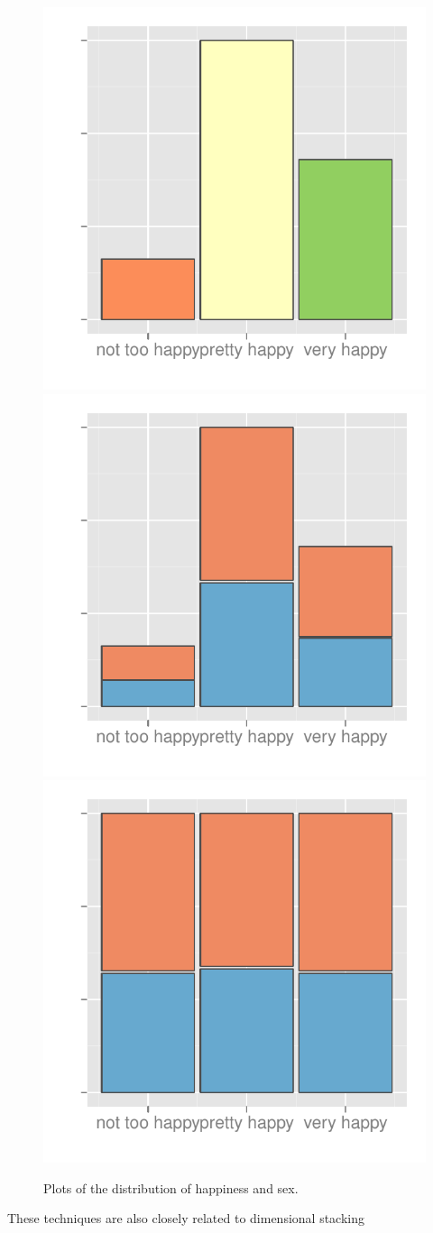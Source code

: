\documentclass[letterpaper,oneside]{scrartcl}
\begin{document}
\begin{figure}[htbp]
  \includegraphics[width=0.33\linewidth]{fact-happy-2}%
  \includegraphics[width=0.33\linewidth]{fact-happy-sex-2}%
  \includegraphics[width=0.33\linewidth]{fact-happy|sex-2}

  \caption{Plots of the distribution of happiness and sex.}
  \label{fig:fact-simple}
\end{figure}


These techniques are also closely related to dimensional stacking \citep{leblanc:1990}

% 


%
%
%
%
\end{document}
